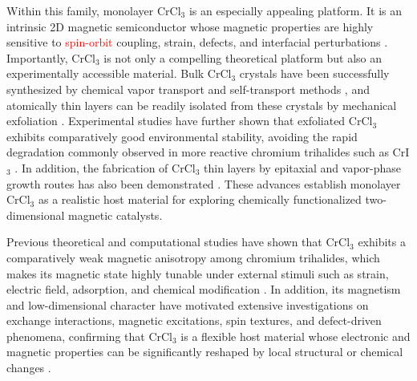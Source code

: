 \documentclass[a4paper,fleqn]{cas-dc}
\begin{document}
Within this family, monolayer CrCl$_3$ is an especially appealing platform. It is an intrinsic 2D magnetic semiconductor whose magnetic properties are highly sensitive to \textcolor{red}{spin-orbit} coupling, strain, defects, and interfacial perturbations \cite{Xue2019,Webster2018,Dupont2021,Lee2026,Zhu2025}. Importantly, CrCl$_3$ is not only a compelling theoretical platform but also an experimentally accessible material. Bulk CrCl$_3$ crystals have been successfully synthesized by chemical vapor transport \cite{Abdel-Hafiez2025} and self-transport methods \cite{Mastrippolito2021}, and atomically thin layers can be readily isolated from these crystals by mechanical exfoliation \cite{Kazim_2020}. Experimental studies have further shown that exfoliated CrCl$_3$ exhibits comparatively good environmental stability, avoiding the rapid degradation commonly observed in more reactive chromium trihalides such as CrI$_3$ \cite{Mastrippolito2021}. In addition, the fabrication of CrCl$_3$ thin layers by epitaxial and vapor-phase growth routes has also been demonstrated \cite{Bedoya2021,Wang2022}. These advances establish monolayer CrCl$_3$ as a realistic host material for exploring chemically functionalized two-dimensional magnetic catalysts.

Previous theoretical and computational studies have shown that CrCl$_3$ exhibits a comparatively weak magnetic anisotropy among chromium trihalides, which makes its magnetic state highly tunable under external stimuli such as strain, electric field, adsorption, and chemical modification \cite{Webster2018,Ebrahimian2023,Esteras2023}. In addition, its magnetism and low-dimensional character have motivated extensive investigations on exchange interactions, magnetic excitations, spin textures, and defect-driven phenomena, confirming that CrCl$_3$ is a flexible host material whose electronic and magnetic properties can be significantly reshaped by local structural or chemical changes \cite{Sarkar2021,Stagraczynski2024,Esquembre-Kucukalic2025,Lu2020,Mastrippolito2021}.
\end{document}
